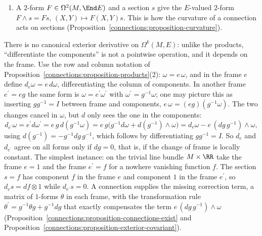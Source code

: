 \begin{example}
\begin{enumerate}
$\theta \wedge \eta = \bigl(\begin{smallmatrix} 0 & 0\\ dy \wedge dx & 0\end{smallmatrix}\bigr)$ and $\eta \wedge \theta = \bigl(\begin{smallmatrix} 0 & dx \wedge dx\\ 0 & 0\end{smallmatrix}\bigr) = 0$.
\item A $2$-form $F \in \Omega^2(M, \End E)$ and a section $s$ give the $E$-valued $2$-form $F \wedge s = Fs$, $(X, Y) \mapsto F(X, Y)s$. This is how the curvature of a connection acts on sections
(Proposition~\ref{connections:proposition-curvature}).
\end{enumerate}
\end{example}

\begin{remark}\label{connections:remark-no-canonical-d}
There is no canonical exterior derivative on $\Omega^k(M, E)$: unlike the products, ``differentiate the components'' is not a pointwise operation, and it depends on the frame. Use the row and
column notation of Proposition~\ref{connections:proposition-products}(2): $\omega = e\,\omega$, and in the frame $e$ define $d_e\omega = e\,d\omega$, differentiating the column of components. In another
frame $e^{\prime} = eg$ the same form is $\omega = e^{\prime}\omega^{\prime}$ with $\omega^{\prime} = g^{-1}\omega$; one may picture this as inserting $gg^{-1} = I$ between frame and components,
$e\,\omega = (eg)(g^{-1}\omega)$. The two changes cancel in $\omega$, but $d$ only sees the one in the components:
\[
d_{e^{\prime}}\omega = e^{\prime}d\omega^{\prime} = e\,g\,d(g^{-1}\omega) = e\,g\bigl(g^{-1}d\omega + d(g^{-1}) \wedge \omega\bigr) = d_e\omega - e\,(dg\,g^{-1}) \wedge \omega,
\]
using $d(g^{-1}) = -g^{-1}dg\,g^{-1}$, which follows by differentiating $gg^{-1} = I$. So $d_e$ and $d_{e^{\prime}}$ agree on all forms only if $dg = 0$, that is, if the change of frame is locally constant.
The simplest instance: on the trivial line bundle $M \times \RR$ take the frame $e = 1$ and the frame $e^{\prime} = f$ for a nowhere vanishing function $f$. The section $s = f$ has component $f$ in the
frame $e$ and component $1$ in the frame $e^{\prime}$, so $d_es = df \otimes 1$ while $d_{e^{\prime}}s = 0$. A connection supplies the missing correction term, a matrix of $1$-forms $\theta$ in each
frame, with the transformation rule $\theta^{\prime} = g^{-1}\theta g + g^{-1}dg$ that exactly compensates the term $e\,(dg\,g^{-1}) \wedge \omega$
(Proposition~\ref{connections:proposition-connections-exist} and Proposition~\ref{connections:proposition-exterior-covariant}).
\end{remark}


